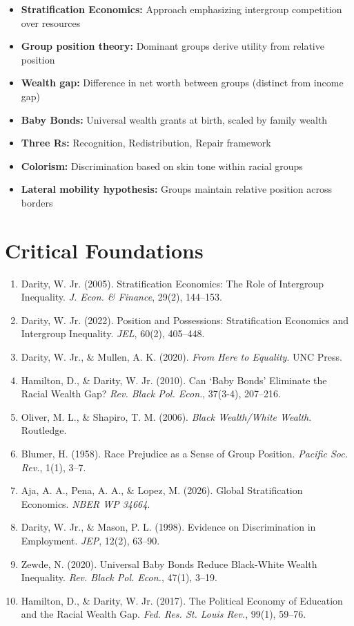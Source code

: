 \begin{itemize}
    \item \textbf{Stratification Economics:} Approach emphasizing intergroup competition over resources
    \item \textbf{Group position theory:} Dominant groups derive utility from relative position
    \item \textbf{Wealth gap:} Difference in net worth between groups (distinct from income gap)
    \item \textbf{Baby Bonds:} Universal wealth grants at birth, scaled by family wealth
    \item \textbf{Three Rs:} Recognition, Redistribution, Repair framework
    \item \textbf{Colorism:} Discrimination based on skin tone within racial groups
    \item \textbf{Lateral mobility hypothesis:} Groups maintain relative position across borders
\end{itemize}

\section{Critical Foundations}
\label{sec:se-foundations}

\begin{enumerate}
    \item Darity, W. Jr. (2005). Stratification Economics: The Role of Intergroup Inequality. \textit{J. Econ. \& Finance}, 29(2), 144--153.
    \item Darity, W. Jr. (2022). Position and Possessions: Stratification Economics and Intergroup Inequality. \textit{JEL}, 60(2), 405--448.
    \item Darity, W. Jr., \& Mullen, A. K. (2020). \textit{From Here to Equality}. UNC Press.
    \item Hamilton, D., \& Darity, W. Jr. (2010). Can `Baby Bonds' Eliminate the Racial Wealth Gap? \textit{Rev. Black Pol. Econ.}, 37(3-4), 207--216.
    \item Oliver, M. L., \& Shapiro, T. M. (2006). \textit{Black Wealth/White Wealth}. Routledge.
    \item Blumer, H. (1958). Race Prejudice as a Sense of Group Position. \textit{Pacific Soc. Rev.}, 1(1), 3--7.
    \item Aja, A. A., Pena, A. A., \& Lopez, M. (2026). Global Stratification Economics. \textit{NBER WP 34664}.
    \item Darity, W. Jr., \& Mason, P. L. (1998). Evidence on Discrimination in Employment. \textit{JEP}, 12(2), 63--90.
    \item Zewde, N. (2020). Universal Baby Bonds Reduce Black-White Wealth Inequality. \textit{Rev. Black Pol. Econ.}, 47(1), 3--19.
    \item Hamilton, D., \& Darity, W. Jr. (2017). The Political Economy of Education and the Racial Wealth Gap. \textit{Fed. Res. St. Louis Rev.}, 99(1), 59--76.
\end{enumerate}

